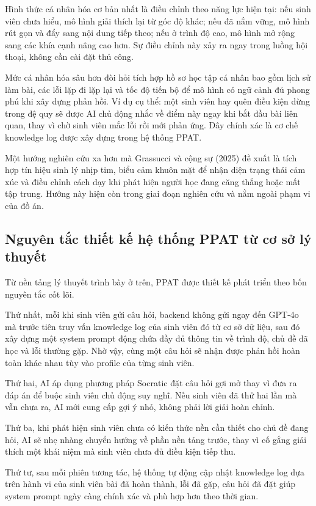 \documentclass[../main.tex]{subfiles}
\begin{document}
Hình thức cá nhân hóa cơ bản nhất là điều chỉnh theo năng lực hiện tại: nếu sinh viên chưa hiểu, mô hình giải thích lại từ góc độ khác; nếu đã nắm vững, mô hình rút gọn và đẩy sang nội dung tiếp theo; nếu ở trình độ cao, mô hình mở rộng sang các khía cạnh nâng cao hơn. Sự điều chỉnh này xảy ra ngay trong luồng hội thoại, không cần cài đặt thủ công.

Mức cá nhân hóa sâu hơn đòi hỏi tích hợp hồ sơ học tập cá nhân bao gồm lịch sử làm bài, các lỗi lặp đi lặp lại và tốc độ tiến bộ để mô hình có ngữ cảnh đủ phong phú khi xây dựng phản hồi. Ví dụ cụ thể: một sinh viên hay quên điều kiện dừng trong đệ quy sẽ được AI chủ động nhắc về điểm này ngay khi bắt đầu bài liên quan, thay vì chờ sinh viên mắc lỗi rồi mới phản ứng. Đây chính xác là cơ chế knowledge log được xây dựng trong hệ thống PPAT.

Một hướng nghiên cứu xa hơn mà Grassucci và cộng sự (2025) đề xuất là tích hợp tín hiệu sinh lý nhịp tim, biểu cảm khuôn mặt để nhận diện trạng thái cảm xúc và điều chỉnh cách dạy khi phát hiện người học đang căng thẳng hoặc mất tập trung. Hướng này hiện còn trong giai đoạn nghiên cứu và nằm ngoài phạm vi của đồ án.

\subsection{Nguyên tắc thiết kế hệ thống PPAT từ cơ sở lý thuyết}

Từ nền tảng lý thuyết trình bày ở trên, PPAT được thiết kế phát triển theo bốn nguyên tắc cốt lõi.

Thứ nhất, mỗi khi sinh viên gửi câu hỏi, backend không gửi ngay đến GPT-4o mà trước tiên truy vấn knowledge log của sinh viên đó từ cơ sở dữ liệu, sau đó xây dựng một system prompt động chứa đầy đủ thông tin về trình độ, chủ đề đã học và lỗi thường gặp. Nhờ vậy, cùng một câu hỏi sẽ nhận được phản hồi hoàn toàn khác nhau tùy vào profile của từng sinh viên.

Thứ hai, AI áp dụng phương pháp Socratic đặt câu hỏi gợi mở thay vì đưa ra đáp án để buộc sinh viên chủ động suy nghĩ. Nếu sinh viên đã thử hai lần mà vẫn chưa ra, AI mới cung cấp gợi ý nhỏ, không phải lời giải hoàn chỉnh.

Thứ ba, khi phát hiện sinh viên chưa có kiến thức nền cần thiết cho chủ đề đang hỏi, AI sẽ nhẹ nhàng chuyển hướng về phần nền tảng trước, thay vì cố gắng giải thích một khái niệm mà sinh viên chưa đủ điều kiện tiếp thu.

Thứ tư, sau mỗi phiên tương tác, hệ thống tự động cập nhật knowledge log dựa trên hành vi của sinh viên bài đã hoàn thành, lỗi đã gặp, câu hỏi đã đặt giúp system prompt ngày càng chính xác và phù hợp hơn theo thời gian.
\end{document}

